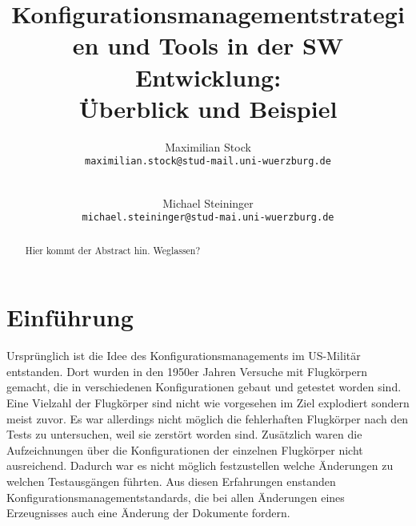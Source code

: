 \documentclass[runningheads,a4paper]{uwsese}
\begin{document}
\mainmatter

\title{Konfigurationsmanagementstrategien und Tools in der SW Entwicklung:\\ Überblick und Beispiel}


\author{
  Maximilian Stock\\
  \texttt{maximilian.stock@stud-mail.uni-wuerzburg.de}\\
  \and\\
  Michael Steininger\\
  \texttt{michael.steininger@stud-mai.uni-wuerzburg.de}
}
%



\maketitle


\begin{abstract}
	Hier kommt der Abstract hin. Weglassen?
\end{abstract}


\section{Einführung}
Ursprünglich ist die Idee des Konfigurationsmanagements im US-Militär
entstanden. Dort wurden in den 1950er Jahren Versuche mit Flugkörpern gemacht,
die in verschiedenen Konfigurationen gebaut und getestet worden sind. Eine
Vielzahl der Flugkörper sind nicht wie vorgesehen im Ziel explodiert sondern
meist zuvor. Es war allerdings nicht möglich die fehlerhaften Flugkörper nach
den Tests zu untersuchen, weil sie zerstört worden sind. Zusätzlich waren die
Aufzeichnungen über die Konfigurationen der einzelnen Flugkörper nicht
ausreichend. Dadurch war es nicht möglich festzustellen welche Änderungen zu
welchen Testausgängen führten. Aus diesen Erfahrungen enstanden
Konfigurationsmanagementstandards, die bei allen Änderungen eines Erzeugnisses
auch eine Änderung der Dokumente fordern.
\end{document}
